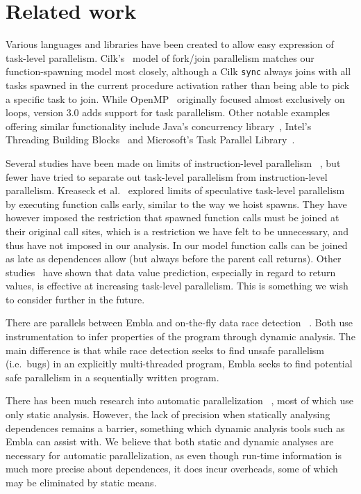 \section{Related work}

Various languages and libraries have been created to allow easy
expression of task-level parallelism.  Cilk's~\cite{blumofe96cilk}
model of fork/join parallelism matches our function-spawning model
most closely, although a Cilk {\tt sync} always joins with all tasks 
spawned in the current procedure activation rather than being able to 
pick a specific task to join. While OpenMP~\cite{dagum98openmp} 
originally focused almost exclusively on loops, version 3.0 adds 
support for task parallelism.  Other notable examples
offering similar functionality 
include Java's concurrency library~\cite{lea00java}, Intel's
Threading Building Blocks~\cite{reinders07intel} and Microsoft's
Task Parallel Library~\cite{leijen07parallel}.

Several studies have been made on limits of instruction-level parallelism~
\cite{wall91limits, postiff99limits, austin92dynamic, lam92limits,
mak09limits}, but fewer have tried to separate out task-level
parallelism from instruction-level parallelism.  Kreaseck et al.\
 explored limits of speculative task-level
parallelism by executing function calls early, similar to the
way we hoist spawns.  They have however imposed the restriction that
spawned function calls must be joined at their original call sites,
which is a restriction we have felt to be unnecessary, and thus have
not imposed in our analysis.  In our model function calls can be
joined as late as dependences allow (but always before the parent
call returns).  Other studies~\cite{warg01limits, oplinger99insearch}
have shown that data value prediction, especially in regard to return
values, is effective at increasing task-level parallelism.  This is
something we wish to consider further in the future.

There are parallels between Embla and on-the-fly data race detection~
\cite{MellorCrummey91onthefly, ha02space, savage97eraser}.  Both use
instrumentation to infer properties of the program through dynamic
analysis.  The main difference is that while race detection seeks to
find unsafe parallelism (i.e.\ bugs) in an explicitly multi-threaded
program, Embla seeks to find potential safe parallelism in a
sequentially written program.

There has been much research into automatic parallelization~
\cite{kennedy02optimizing, Blume94polaris, ottoni05automatic,
ottoni07global}, most of which use only static analysis.  However,
the lack of precision when statically analysing dependences remains a
barrier, something which dynamic analysis tools such as Embla can assist
with.  We believe that both static and dynamic analyses are necessary
for automatic parallelization, as even though run-time information is
much more precise about dependences, it does incur overheads, some of
which may be eliminated by static means.

